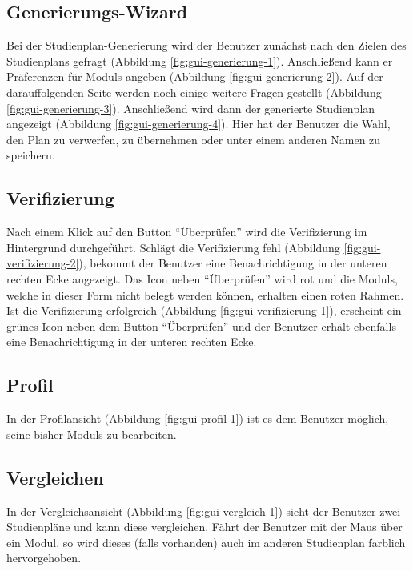 \subsection{Generierungs-Wizard}
\label{subsec:gui-generierung}
Bei der Studienplan-Generierung wird der \gls{Benutzer} zunächst nach den Zielen des Studienplans gefragt (Abbildung \ref{fig:gui-generierung-1}). Anschließend kann er Präferenzen für \glspl{Modul} angeben (Abbildung \ref{fig:gui-generierung-2}). Auf der darauffolgenden Seite werden noch einige weitere Fragen gestellt (Abbildung \ref{fig:gui-generierung-3}). Anschließend wird dann der generierte Studienplan angezeigt (Abbildung \ref{fig:gui-generierung-4}). Hier hat der \gls{Benutzer} die Wahl, den Plan zu verwerfen, zu übernehmen oder unter einem anderen Namen zu speichern.


\subsection{Verifizierung}
\label{subsec:gui-verifizierung}
Nach einem Klick auf den Button \enquote{Überprüfen} wird die Verifizierung im Hintergrund durchgeführt.\newline
Schlägt die Verifizierung fehl (Abbildung \ref{fig:gui-verifizierung-2}), bekommt der \gls{Benutzer} eine Benachrichtigung in der unteren rechten Ecke angezeigt. Das Icon neben \enquote{Überprüfen} wird rot und die \glspl{Modul}, welche in dieser Form nicht belegt werden können, erhalten einen roten Rahmen.\newline
Ist die Verifizierung erfolgreich (Abbildung \ref{fig:gui-verifizierung-1}), erscheint ein grünes Icon neben dem Button \enquote{Überprüfen} und der \gls{Benutzer} erhält ebenfalls eine Benachrichtigung in der unteren rechten Ecke.


\subsection{Profil}
In der Profilansicht (Abbildung \ref{fig:gui-profil-1}) ist es dem Benutzer möglich, seine bisher  \glspl{Modul} zu bearbeiten.

\subsection{Vergleichen}
In der Vergleichsansicht (Abbildung \ref{fig:gui-vergleich-1}) sieht der \gls{Benutzer} zwei Studienpläne und kann diese vergleichen. Fährt der Benutzer mit der Maus über ein Modul, so wird dieses (falls vorhanden) auch im anderen Studienplan farblich hervorgehoben.
